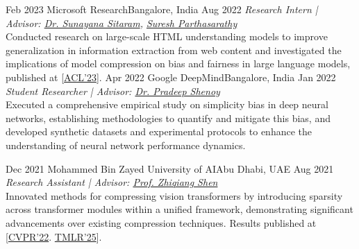 \begin{experiences}
      \researchexperience
    {Feb 2023}   {Microsoft Research}{Bangalore, India}{}
    {Aug 2022} {\textit{Research Intern | Advisor: \href{https://www.microsoft.com/en-us/research/people/susitara/}{Dr. Sunayana Sitaram}, \href{https://www.microsoft.com/en-us/research/people/supartha/}{Suresh Parthasarathy}}\\
    Conducted research on large-scale HTML understanding models to improve generalization in information extraction from web content and investigated the implications of model compression on bias and fairness in large language models, published at [\hyperref[C5]{ACL'23}].
    }
  \emptySeparator
    \researchexperience
    {Apr 2022}   {Google DeepMind}{Bangalore, India}{}
    {Jan 2022} {\textit{Student Researcher | Advisor: \href{https://sites.google.com/site/pshenoyuw/}{Dr. Pradeep Shenoy}}\\
    Executed a comprehensive empirical study on simplicity bias in deep neural networks, establishing methodologies to quantify and mitigate this bias, and developed synthetic datasets and experimental protocols to enhance the understanding of neural network performance dynamics.
    }
  \emptySeparator

    \researchexperience
    {Dec 2021}   {Mohammed Bin Zayed University of AI}{Abu Dhabi, UAE}{}
    {Aug 2021} {\textit{Research Assistant | Advisor: \href{https://zhiqiangshen.com/}{Prof. Zhiqiang Shen}}\\
    Innovated methods for compressing vision transformers by introducing sparsity across transformer modules within a unified framework, demonstrating significant advancements over existing compression techniques. Results published at [\hyperref[C3]{CVPR'22}. \hyperref[S1]{TMLR'25}].
    }
    

\end{experiences}
